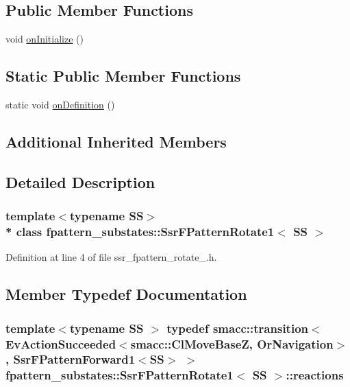 \subsection*{Public Member Functions}
\begin{DoxyCompactItemize}
\item 
void \hyperlink{structfpattern__substates_1_1SsrFPatternRotate1_abdd10e56b1e0c3a008a54ec4afbaa61d}{on\+Initialize} ()
\end{DoxyCompactItemize}
\subsection*{Static Public Member Functions}
\begin{DoxyCompactItemize}
\item 
static void \hyperlink{structfpattern__substates_1_1SsrFPatternRotate1_a042018fcfa8ac8841183b64c89df3c28}{on\+Definition} ()
\end{DoxyCompactItemize}
\subsection*{Additional Inherited Members}


\subsection{Detailed Description}
\subsubsection*{template$<$typename SS$>$\\*
class fpattern\+\_\+substates\+::\+Ssr\+F\+Pattern\+Rotate1$<$ S\+S $>$}



Definition at line 4 of file ssr\+\_\+fpattern\+\_\+rotate\+\_.\+h.



\subsection{Member Typedef Documentation}
\subsubsection[{\texorpdfstring{reactions}{reactions}}]{\setlength{\rightskip}{0pt plus 5cm}template$<$typename SS $>$ typedef {\bf smacc\+::transition}$<$Ev\+Action\+Succeeded$<${\bf smacc\+::\+Cl\+Move\+BaseZ}, Or\+Navigation$>$, {\bf Ssr\+F\+Pattern\+Forward1}$<$SS$>$ $>$ {\bf fpattern\+\_\+substates\+::\+Ssr\+F\+Pattern\+Rotate1}$<$ SS $>$\+::{\bf reactions}}\hypertarget{structfpattern__substates_1_1SsrFPatternRotate1_a5e535d319123c4e3805a110a569a2d40}{}\label{structfpattern__substates_1_1SsrFPatternRotate1_a5e535d319123c4e3805a110a569a2d40}


